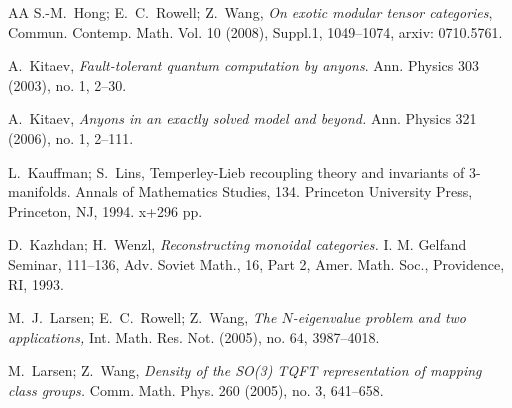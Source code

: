 \documentclass[12pt,psamsfonts]{amsart}
\numberwithin{equation}{section}
\theoremstyle{definition}
\begin{document}
\begin{thebibliography}{AA}
 S.-M.\ Hong; E.\ C.\ Rowell; Z.\ Wang, \emph{On exotic modular tensor categories}, Commun. Contemp. Math. Vol. 10 (2008), Suppl.1, 1049--1074, arxiv: 0710.5761.






A.\ Kitaev, \emph{Fault-tolerant quantum computation by anyons}.
Ann. Physics 303 (2003), no. 1, 2--30.

A.\ Kitaev, \emph{Anyons in an exactly solved model and beyond.}
 Ann. Physics 321 (2006), no. 1, 2--111.


L.\  Kauffman; S.\  Lins, Temperley-Lieb
recoupling theory and invariants of $3$-manifolds.
 Annals of Mathematics Studies, 134. Princeton University Press, Princeton, NJ, 1994. x+296 pp.

D.\ Kazhdan; H.\ Wenzl,
\emph{Reconstructing monoidal categories.} I. M. Gelfand Seminar,
111--136, Adv. Soviet Math., 16, Part 2, Amer. Math. Soc.,
Providence, RI, 1993.

M.\ J.\ Larsen; E.\ C.\ Rowell; Z.\ Wang, \textit{The $N$-eigenvalue problem and two applications,}
Int. Math. Res. Not. (2005), no. 64, 3987--4018.

M.\ Larsen; Z.\ Wang, \emph{Density of the SO(3) TQFT
representation of mapping class groups.} Comm. Math. Phys. 260
(2005), no. 3, 641--658.


\end{thebibliography}
\end{document}
